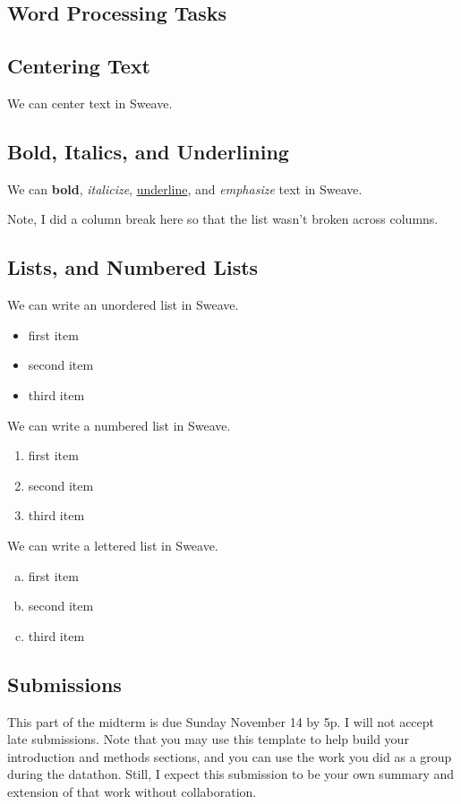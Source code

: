 \documentclass{article}\usepackage[]{graphicx}\usepackage[]{xcolor}
\begin{document}
\begin{multicols}{2}
\section{Word Processing Tasks}

\subsection{Centering Text}
\begin{center}
We can center text in Sweave.
\end{center}

\subsection{Bold, Italics, and Underlining}
We can \textbf{bold}, \textit{italicize}, \underline{underline}, and \emph{emphasize} text in Sweave.

Note, I did a column break here so that the list wasn’t broken across columns.
\columnbreak 

\subsection{Lists, and Numbered Lists}
We can write an unordered list in Sweave.
\begin{itemize}
  \item first item
  \item second item
  \item third item
\end{itemize}

We can write a numbered list in Sweave.
\begin{enumerate}
  \item first item
  \item second item
  \item third item
\end{enumerate}

We can write a lettered list in Sweave.
\begin{enumerate}[a.]\itemsep0em
  \item{first item}
  \item{second item}
  \item{third item}
\end{enumerate}

\subsection{Submissions}
This part of the midterm is due Sunday November 14 by 5p. I will not accept late submissions. Note that you may use this template to help build your introduction and methods sections, and you can use the work you did as a group during the datathon. Still, I expect this submission to be your own summary and extension of that work without collaboration.


\end{multicols}
\end{document}
